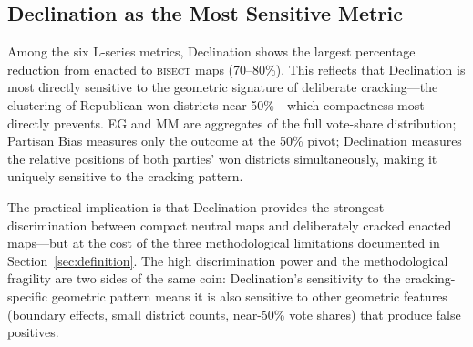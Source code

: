 \subsection{Declination as the Most Sensitive Metric}

Among the six L-series metrics, Declination shows the largest percentage reduction
from enacted to \textsc{bisect} maps (70--80\%). This reflects that Declination is
most directly sensitive to the geometric signature of deliberate cracking---the
clustering of Republican-won districts near 50\%---which compactness most directly
prevents. EG and MM are aggregates of the full vote-share distribution; Partisan Bias
measures only the outcome at the 50\% pivot; Declination measures the relative
positions of both parties' won districts simultaneously, making it uniquely sensitive
to the cracking pattern.

The practical implication is that Declination provides the strongest discrimination
between compact neutral maps and deliberately cracked enacted maps---but at the cost
of the three methodological limitations documented in Section~\ref{sec:definition}.
The high discrimination power and the methodological fragility are two sides of the
same coin: Declination's sensitivity to the cracking-specific geometric pattern means
it is also sensitive to other geometric features (boundary effects, small district
counts, near-50\% vote shares) that produce false positives.
